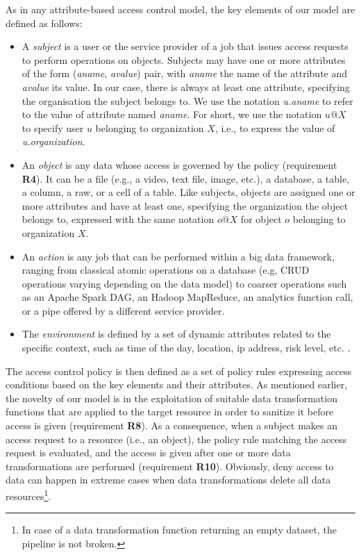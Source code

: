 As in any attribute-based access control model, the key elements of our model are defined as follows:
\begin{itemize}
\item A {\it subject} is a user or the service provider of a job that issues access requests to perform operations on objects. Subjects may have one or more attributes of the form (\textit{aname}, \textit{avalue}) pair, with \textit{aname} the name of the attribute and \textit{avalue} its value. In our case, there is always at least one attribute, specifying the organisation the subject belongs to. We use the notation \textit{u.aname} to refer to the value of attribute named \textit{aname}. For short, we use the notation $u@X$ to specify user $u$ belonging to organization $X$, i.e., to express the value of  \textit{u.organization}. 

\item An {\it object} is any data whose access is governed by the policy (requirement {\bf R4}). It can be a file (e.g., a video, text file, image, etc.), a database, a table, a column, a raw, or a cell of a table. Like subjects, objects are assigned one or more attributes and have at least one, specifying the organization the object belongs to, expressed with the same notation $o@X$ for object $o$ belonging to organization $X$.

\item An {\it action} is any job that can be performed within a big data framework, ranging from classical atomic operations on a database (e.g, CRUD operations varying depending on the data model) to coarser operations such as an Apache Spark DAG, an Hadoop MapReduce, an analytics function call, or a pipe offered by a different service provider. 

\item The {\it environment} is defined by a set of dynamic attributes related to the specific context, such as time of the day, location, ip address, risk level, etc. . 

\end{itemize}

The access control policy is then defined as a set of policy rules expressing access conditions based on the key elements and their attributes. As mentioned earlier, the novelty of our model is in the exploitation of suitable data transformation functions that are applied to the target resource in order to sanitize it before access is given (requirement {\bf R8}).
As a consequence, when a subject makes an access request to a resource (i.e., an object), the policy rule matching the access request is evaluated, and the access is given after one or more data transformations are performed (requirement {\bf R10}). Obviously, deny access to data can happen in extreme cases when data transformations delete all data resources\footnote{In case of a data transformation function returning an empty dataset, the pipeline is not broken.}. 




